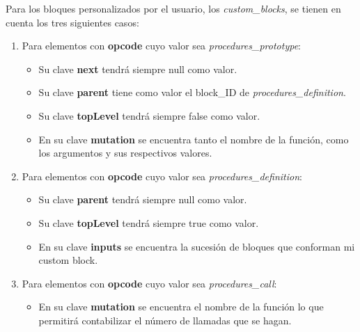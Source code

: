 \documentclass[a4paper, 12pt]{book}
\begin{document}
\newpage 
Para los bloques personalizados por el usuario, los \textit{custom\_blocks}, se tienen en cuenta los tres siguientes casos:

\begin{enumerate}
\item Para elementos con \textbf{opcode} cuyo valor sea \textit{procedures\_prototype}:
\begin{itemize}
\item Su clave \textbf{next} tendrá siempre null como valor.
\item Su clave \textbf{parent} tiene como valor el block\_ID de \textit{procedures\_definition}.
\item Su clave \textbf{topLevel} tendrá siempre false como valor.
\item En su clave \textbf{mutation} se encuentra tanto el nombre de la función, como los argumentos y sus respectivos valores.
\end{itemize}

\item Para elementos con \textbf{opcode} cuyo valor sea \textit{procedures\_definition}:
\begin{itemize}
\item Su clave \textbf{parent} tendrá siempre null como valor.
\item Su clave \textbf{topLevel} tendrá siempre true como valor.
\item En su clave \textbf{inputs} se encuentra la sucesión de bloques que conforman mi custom block.
\end{itemize}

\item Para elementos con \textbf{opcode} cuyo valor sea \textit{procedures\_call}:
\begin{itemize}
\item En su clave \textbf{mutation} se encuentra el nombre de la función lo que permitirá contabilizar el número de llamadas que se hagan.
\end{itemize}
\end{enumerate}
\end{document}
